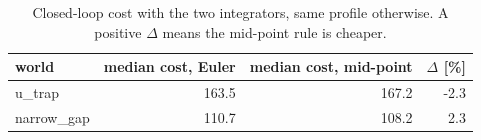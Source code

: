 \begin{table}[htbp]
  \centering
  \small
  \caption{Closed-loop cost with the two integrators, same profile otherwise. A positive $\Delta$ means the mid-point rule is cheaper.}
  \label{res:tab:integloop}
  \begin{tabular}{lrrr}
    \toprule
    world & median cost, Euler & median cost, mid-point & $\Delta$ [\%] \\
    \midrule
    u\_trap & 163.5 & 167.2 & -2.3 \\
    narrow\_gap & 110.7 & 108.2 & 2.3 \\
    \bottomrule
  \end{tabular}
\end{table}

